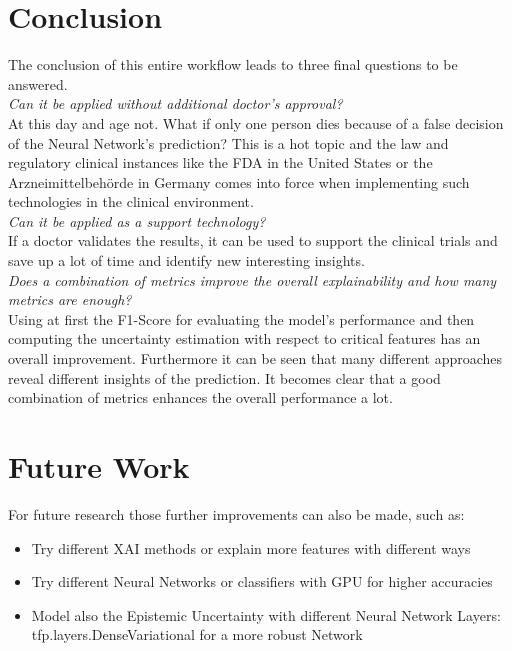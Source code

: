 \documentclass[journal]{IEEEtran}
\begin{document}
 
\section{Conclusion}
\noindent The conclusion of this entire workflow leads to three final questions to be answered. \\

\textit{Can it be applied without additional doctor’s approval?} \\

At this day and age not. What if only one person dies because of a false decision of the Neural Network's prediction? This is a hot topic and the law and regulatory clinical instances like the FDA in the United States or the Arzneimittelbehörde in Germany comes into force when implementing such technologies in the clinical environment. \\

\textit{Can it be applied as a support technology?} \\

If a doctor validates the results, it can be used to support the clinical trials and save up a lot of time and identify new interesting insights. \\

\textit{Does a combination of metrics improve the overall explainability and how many metrics are enough?} \\ 

Using at first the F1-Score for evaluating the model's performance and then computing the uncertainty estimation with respect to critical features has an overall improvement. Furthermore it can be seen that many different approaches reveal different insights of the prediction. It becomes clear that a good combination of metrics enhances the overall performance a lot.


\section{Future Work}
\noindent For future research those further improvements can also be made, such as: \\

\begin{itemize}
	\item Try different XAI methods or explain more features with different ways
	\item Try different Neural Networks or classifiers with GPU for higher accuracies
	\item Model also the Epistemic Uncertainty with different Neural Network Layers: tfp.layers.DenseVariational for a more robust Network
\end{itemize}
\end{document}

